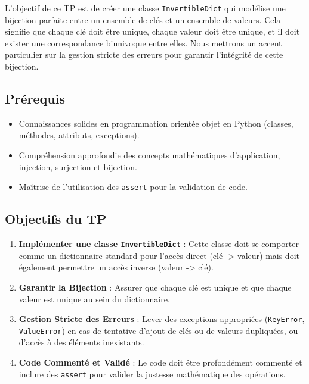 \documentclass[12pt,a4paper]{report}
\newcommand{\passthrough}[1]{#1}
\providecommand{\tightlist}{%
  \setlength{\itemsep}{0pt}\setlength{\parskip}{0pt}}
\begin{document}
L'objectif de ce TP est de créer une classe
\passthrough{\lstinline!InvertibleDict!} qui modélise une bijection
parfaite entre un ensemble de clés et un ensemble de valeurs. Cela
signifie que chaque clé doit être unique, chaque valeur doit être
unique, et il doit exister une correspondance biunivoque entre elles.
Nous mettrons un accent particulier sur la gestion stricte des erreurs
pour garantir l'intégrité de cette bijection.

\subsection{Prérequis}\label{pruxe9requis}

\begin{itemize}
\tightlist
\item
  Connaissances solides en programmation orientée objet en Python
  (classes, méthodes, attributs, exceptions).
\item
  Compréhension approfondie des concepts mathématiques d'application,
  injection, surjection et bijection.
\item
  Maîtrise de l'utilisation des \passthrough{\lstinline!assert!} pour la
  validation de code.
\end{itemize}

\subsection{Objectifs du TP}\label{objectifs-du-tp}

\begin{enumerate}
\def\labelenumi{\arabic{enumi}.}
\tightlist
\item
  \textbf{Implémenter une classe
  \passthrough{\lstinline!InvertibleDict!}} : Cette classe doit se
  comporter comme un dictionnaire standard pour l'accès direct (clé
  -\textgreater{} valeur) mais doit également permettre un accès inverse
  (valeur -\textgreater{} clé).
\item
  \textbf{Garantir la Bijection} : Assurer que chaque clé est unique et
  que chaque valeur est unique au sein du dictionnaire.
\item
  \textbf{Gestion Stricte des Erreurs} : Lever des exceptions
  appropriées (\passthrough{\lstinline!KeyError!},
  \passthrough{\lstinline!ValueError!}) en cas de tentative d'ajout de
  clés ou de valeurs dupliquées, ou d'accès à des éléments inexistants.
\item
  \textbf{Code Commenté et Validé} : Le code doit être profondément
  commenté et inclure des \passthrough{\lstinline!assert!} pour valider
  la justesse mathématique des opérations.
\end{enumerate}
\end{document}
